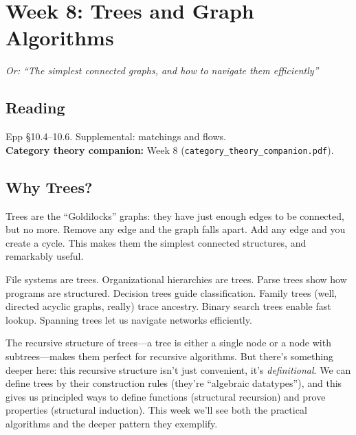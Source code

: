 \section{Week 8: Trees and Graph Algorithms}

\textit{Or: ``The simplest connected graphs, and how to navigate them efficiently''}

\subsection*{Reading}
Epp \S 10.4--10.6. Supplemental: matchings and flows.\\
\textbf{Category theory companion:} Week 8 (\texttt{category\_theory\_companion.pdf}).

\subsection*{Why Trees?}

Trees are the ``Goldilocks'' graphs: they have just enough edges to be connected, but no more. Remove any edge and the graph falls apart. Add any edge and you create a cycle. This makes them the simplest connected structures, and remarkably useful.

File systems are trees. Organizational hierarchies are trees. Parse trees show how programs are structured. Decision trees guide classification. Family trees (well, directed acyclic graphs, really) trace ancestry. Binary search trees enable fast lookup. Spanning trees let us navigate networks efficiently.

The recursive structure of trees---a tree is either a single node or a node with subtrees---makes them perfect for recursive algorithms. But there's something deeper here: this recursive structure isn't just convenient, it's \emph{definitional}. We can define trees by their construction rules (they're ``algebraic datatypes''), and this gives us principled ways to define functions (structural recursion) and prove properties (structural induction). This week we'll see both the practical algorithms and the deeper pattern they exemplify.

